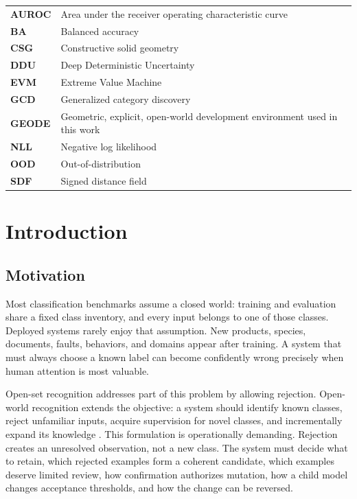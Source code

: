 \documentclass[12pt,oneside]{report}
\begin{document}
\begin{longtable}{>{\bfseries}p{1.0in}p{4.45in}}
AUROC & Area under the receiver operating characteristic curve\\
BA & Balanced accuracy\\
CSG & Constructive solid geometry\\
DDU & Deep Deterministic Uncertainty\\
EVM & Extreme Value Machine\\
GCD & Generalized category discovery\\
GEODE & Geometric, explicit, open-world development environment used in this work\\
NLL & Negative log likelihood\\
OOD & Out-of-distribution\\
SDF & Signed distance field\\
\end{longtable}

\clearpage
{}

\chapter{Introduction}

\section{Motivation}

Most classification benchmarks assume a closed world: training and evaluation
share a fixed class inventory, and every input belongs to one of those classes.
Deployed systems rarely enjoy that assumption. New products, species,
documents, faults, behaviors, and domains appear after training. A system that
must always choose a known label can become confidently wrong precisely when
human attention is most valuable.

Open-set recognition addresses part of this problem by allowing rejection.
Open-world recognition extends the objective: a system should identify known
classes, reject unfamiliar inputs, acquire supervision for novel classes, and
incrementally expand its knowledge \cite{bendale2015}. This formulation is
operationally demanding. Rejection creates an unresolved observation, not a
new class. The system must decide what to retain, which rejected examples form
a coherent candidate, which examples deserve limited review, how confirmation
authorizes mutation, how a child model changes acceptance thresholds, and how
the change can be reversed.
\end{document}
